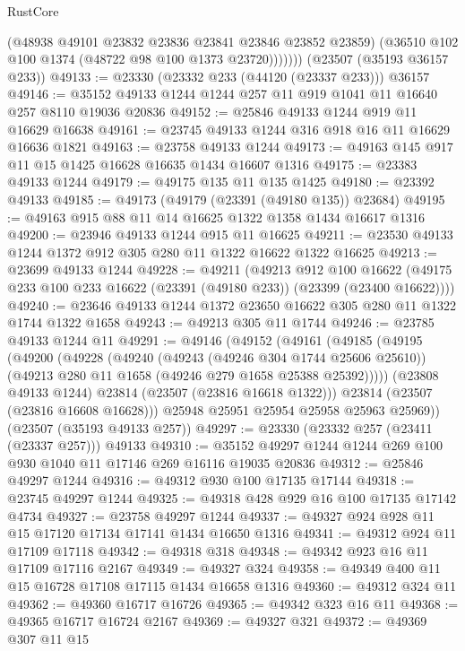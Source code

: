 \begin{lexlean}{RustCore}
\begin{coremodule}
              (@48938 @49101 @23832 @23836 @23841 @23846 @23852 @23859)
              (@36510 @102 @100 @1374 (@48722 @98 @100 @1373 @23720)))))))
    (@23507 (@35193 @36157 @233))
@49133 := @23330 (@23332 @233 (@44120 (@23337 @233))) @36157
@49146 := @35152 @49133 @1244 @1244 @257 @11 @919 @1041 @11 @16640 @257 @8110 @19036 @20836
@49152 := @25846 @49133 @1244 @919 @11 @16629 @16638
@49161 := @23745 @49133 @1244 @316 @918 @16 @11 @16629 @16636 @1821
@49163 := @23758 @49133 @1244
@49173 := @49163 @145 @917 @11 @15 @1425 @16628 @16635 @1434 @16607 @1316
@49175 := @23383 @49133 @1244
@49179 := @49175 @135 @11 @135 @1425
@49180 := @23392 @49133
@49185 := @49173 (@49179 (@23391 (@49180 @135)) @23684)
@49195 := @49163 @915 @88 @11 @14 @16625 @1322 @1358 @1434 @16617 @1316
@49200 := @23946 @49133 @1244 @915 @11 @16625
@49211 := @23530 @49133 @1244 @1372 @912 @305 @280 @11 @1322 @16622 @1322 @16625
@49213 := @23699 @49133 @1244
@49228 := @49211
    (@49213
      @912
      @100
      @16622
      (@49175 @233 @100 @233 @16622 (@23391 (@49180 @233)) (@23399 (@23400 @16622))))
@49240 := @23646 @49133 @1244 @1372 @23650 @16622 @305 @280 @11 @1322 @1744 @1322 @1658
@49243 := @49213 @305 @11 @1744
@49246 := @23785 @49133 @1244 @11
@49291 := @49146
    (@49152
      (@49161
        (@49185
          (@49195
            (@49200
              (@49228
                (@49240
                  (@49243 (@49246 @304 @1744 @25606 @25610))
                  (@49213 @280 @11 @1658 (@49246 @279 @1658 @25388 @25392)))))
            (@23808 @49133 @1244)
            @23814
            (@23507 (@23816 @16618 @1322)))
          @23814
          (@23507 (@23816 @16608 @16628)))
        @25948
        @25951
        @25954
        @25958
        @25963
        @25969))
    (@23507 (@35193 @49133 @257))
@49297 := @23330 (@23332 @257 (@23411 (@23337 @257))) @49133
@49310 := @35152 @49297 @1244 @1244 @269 @100 @930 @1040 @11 @17146 @269 @16116 @19035 @20836
@49312 := @25846 @49297 @1244
@49316 := @49312 @930 @100 @17135 @17144
@49318 := @23745 @49297 @1244
@49325 := @49318 @428 @929 @16 @100 @17135 @17142 @4734
@49327 := @23758 @49297 @1244
@49337 := @49327 @924 @928 @11 @15 @17120 @17134 @17141 @1434 @16650 @1316
@49341 := @49312 @924 @11 @17109 @17118
@49342 := @49318 @318
@49348 := @49342 @923 @16 @11 @17109 @17116 @2167
@49349 := @49327 @324
@49358 := @49349 @400 @11 @15 @16728 @17108 @17115 @1434 @16658 @1316
@49360 := @49312 @324 @11
@49362 := @49360 @16717 @16726
@49365 := @49342 @323 @16 @11
@49368 := @49365 @16717 @16724 @2167
@49369 := @49327 @321
@49372 := @49369 @307 @11 @15

\end{coremodule}
\end{lexlean}
